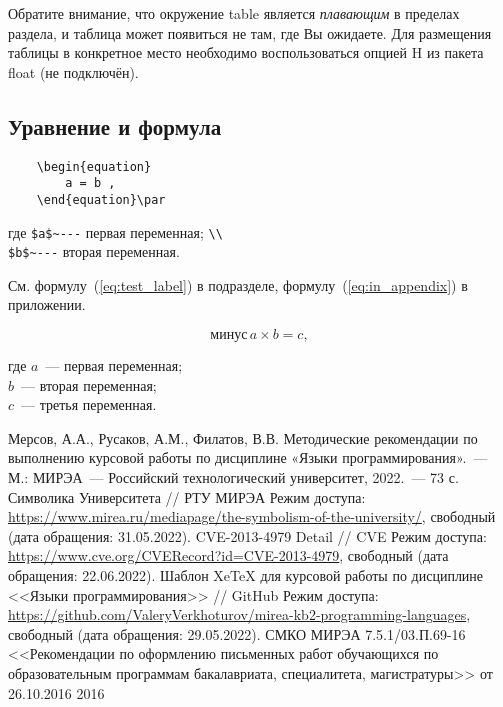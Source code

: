 \documentclass[14pt, a4paper, titlepage]{extarticle}
\begin{document}
Обратите внимание, что окружение table является \emph{плавающим} в пределах раздела, и таблица может появиться не там, где Вы ожидаете. Для размещения таблицы в конкретное место необходимо воспользоваться опцией H из пакета float (не подключён).

\subsection{Уравнение и формула}

\begin{verbatim}
	\begin{equation}
		a = b ,
	\end{equation}\par
\end{verbatim}\vspace{-.5cm}
{где \verb"$a$~---" первая переменная; \verb"\\" \\
	\verb"$b$~---" вторая переменная.}\bigskip

См. формулу~(\ref{eq:test_label}) в подразделе, формулу~(\ref{eq:in_appendix}) в приложении.

\begin{equation}\label{eq:test_label}
	\text{минус}\,a\times b=c ,
\end{equation}

где $a$~--- первая переменная; \\
$b$~--- вторая переменная; \\
$c$~--- третья переменная.



\begin{thebibliography}{99\kern\bibindent}
	 Мерсов, А.А., Русаков, А.М., Филатов, В.В. Методические рекомендации по выполнению курсовой работы по дисциплине «Языки программирования».~--- М.: МИРЭА~--- Российский технологический университет, 2022.~--- 73 с.
	 Символика Университета // РТУ МИРЭА Режим доступа: \url{https://www.mirea.ru/mediapage/the-symbolism-of-the-university/}, свободный (дата обращения: 31.05.2022).
	 CVE-2013-4979 Detail // CVE Режим доступа: \url{https://www.cve.org/CVERecord?id=CVE-2013-4979}, свободный (дата обращения: 22.06.2022).
	 Шаблон XeTeX для курсовой работы по дисциплине <<Языки программирования>> // GitHub Режим доступа: \url{https://github.com/ValeryVerkhoturov/mirea-kb2-programming-languages}, свободный (дата обращения: 29.05.2022).
	 СМКО МИРЭА 7.5.1/03.П.69-16 <<Рекомендации по оформлению письменных работ обучающихся по образовательным программам бакалавриата, специалитета, магистратуры>> от 26.10.2016 2016
\end{thebibliography}
\end{document}
